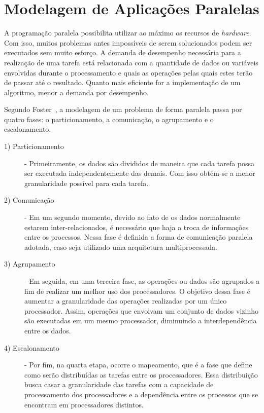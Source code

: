 \section{Modelagem de Aplicações Paralelas} \label{sec:modelagem}

A programação paralela possibilita utilizar ao máximo os recursos de \textit{hardware}. Com isso, muitos problemas antes impossíveis de serem solucionados podem ser executados sem muito esforço. A demanda de desempenho necessária para a realização de uma tarefa está relacionada com a quantidade de dados ou variáveis envolvidas durante o processamento e quais as operações pelas quais estes terão de passar até o resultado. Quanto mais eficiente for a implementação de um algoritmo, menor a demanda por desempenho.

Segundo Foster~\cite{foster1995designing}, a modelagem de um problema de forma paralela passa por quatro fases: o particionamento, a comunicação, o agrupamento e o escalonamento.

\begin{description}
\item[1) Particionamento] - Primeiramente, os dados são divididos de maneira que cada tarefa possa ser executada independentemente das demais. Com isso obtém-se a menor granularidade possível para cada tarefa.

\item[2) Comunicação] - Em um segundo momento, devido ao fato de os dados normalmente estarem inter-relacionados, é necessário que haja a troca de informações entre os processos. Nessa fase é definida a forma de comunicação paralela adotada, caso seja utilizado uma arquitetura multiprocessada.

\item[3) Agrupamento] - Em seguida, em uma terceira fase, as operações ou dados são agrupados a fim de realizar um melhor uso dos processadores. O objetivo dessa fase é aumentar a granularidade das operações realizadas por um único processador. Assim, operações que envolvam um conjunto de dados vizinho são executadas em um mesmo processador, diminuindo a interdependência entre os dados.

\item[4) Escalonamento] - Por fim, na quarta etapa, ocorre o mapeamento, que é a fase que define como serão distribuídas as tarefas entre os processadores. Essa distribuição busca casar a granularidade das tarefas com a capacidade de processamento dos processadores e a dependência entre os processos que se encontram em processadores distintos.

\end{description}

